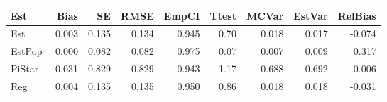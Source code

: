 
\begin{tabular}{lrrrrrrrr}
\toprule
Est & Bias & SE & RMSE & EmpCI & Ttest & MCVar & EstVar & RelBias\\
\midrule
Est & 0.003 & 0.135 & 0.134 & 0.945 & 0.70 & 0.018 & 0.017 & -0.074\\
EstPop & 0.000 & 0.082 & 0.082 & 0.975 & 0.07 & 0.007 & 0.009 & 0.317\\
PiStar & -0.031 & 0.829 & 0.829 & 0.943 & 1.17 & 0.688 & 0.692 & 0.006\\
Reg & 0.004 & 0.135 & 0.135 & 0.950 & 0.86 & 0.018 & 0.018 & -0.031\\
\bottomrule
\end{tabular}